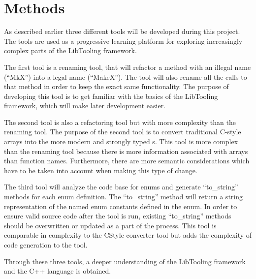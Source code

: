 \chapter{Methods}

As described earlier three different tools will be developed during this project. The tools are used as a progressive learning platform for exploring increasingly complex parts of the LibTooling framework. 

The first tool is a renaming tool, that will refactor a method with an illegal name (``MkX'') into a legal name (``MakeX''). The tool will also rename all the calls to that method in order to keep the exact same functionality. The purpose of developing this tool is to get familiar with the basics of the LibTooling framework, which will make later development easier. 

The second tool is also a refactoring tool but with more complexity than the renaming tool. The purpose of the second tool is to convert traditional C-style arrays into the more modern and strongly typed s. This tool is more complex than the renaming tool because there is more information associated with arrays than function names. Furthermore, there are more semantic considerations which have to be taken into account when making this type of change. 

The third tool will analyze the code base for enums and generate ``to\_string'' methods for each enum definition. The ``to\_string'' method will return a string representation of the named enum constants defined in the enum. In order to ensure valid source code after the tool is run, existing ``to\_string'' methods should be overwritten or updated as a part of the process. 
This tool is comparable in complexity to the CStyle converter tool but adds the complexity of code generation to the tool. 

Through these three tools, a deeper understanding of the LibTooling framework and the C++ language is obtained.